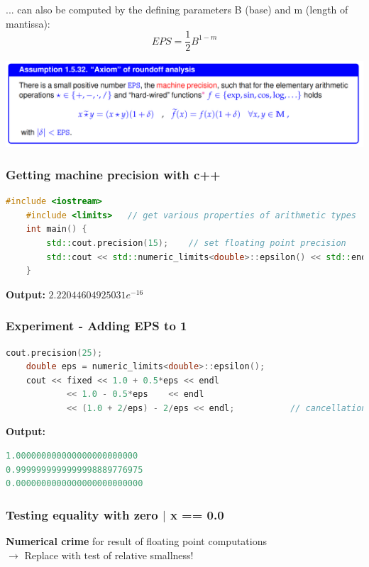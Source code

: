 \documentclass[12pt, a4paper]{article}
\begin{document}
... can also be computed by the defining parameters B (base) and m (length of mantissa): \\
\begin{equation*}
		EPS = \frac{1}{2} B^{1-m}
\end{equation*}
		
\begin{center}
	\includegraphics[width=1.0\textwidth]{axiom_roundoff_analysis.png}
\end{center}
	
\subsubsection{Getting machine precision with c++}
\begin{lstlisting}[language=C++]
	#include <iostream>
	#include <limits> 	// get various properties of arithmetic types
	int main() {
		std::cout.precision(15); 	// set floating point precision
		std::cout << std::numeric_limits<double>::epsilon() << std::endl;
	}
\end{lstlisting}

\textbf{Output:} \quad $2.22044604925031e^{-16}$ \\
\pagebreak

\subsubsection{Experiment - Adding EPS to 1}
\begin{lstlisting}[language=C++]
	cout.precision(25);
	double eps = numeric_limits<double>::epsilon();
	cout << fixed << 1.0 + 0.5*eps << endl
			<< 1.0 - 0.5*eps	<< endl
			<< (1.0 + 2/eps) - 2/eps << endl;			// cancellation here
\end{lstlisting}

\textbf{Output:} 

\begin{lstlisting}[language=c++]
1.000000000000000000000000
0.9999999999999998889776975
0.0000000000000000000000000
\end{lstlisting}


\hspace{5mm}	
\subsubsection{Testing equality with zero $|$ x == 0.0} 
\textbf{Numerical crime} for result of floating point computations \\
$\rightarrow$ Replace with test of relative smallness! \\
	
\end{document}
